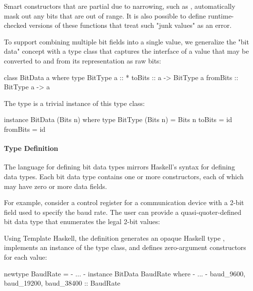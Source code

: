 Smart constructors that are partial due to narrowing,
such as , automatically mask out any bits that are
out of range. It is also possible to define runtime-checked versions
of these functions that treat such "junk values" as an error.

To support combining multiple bit fields into a single value, we
generalize the "bit data" concept with a type class 
that captures the interface of a value that may be converted to
and from its representation as raw bits:

\begin{code}
class BitData a where
  type BitType a :: *
  toBits :: a -> BitType a
  fromBits :: BitType a -> a
\end{code}

The  type is a trivial instance of this type class:

\begin{code}
instance BitData (Bits n) where
  type BitType (Bits n) = Bits n
  toBits   = id
  fromBits = id
\end{code}

\paragraph{Type Definition}
The language for defining bit data types mirrors Haskell's syntax
for defining data types. Each bit data type contains one or more
constructors, each of which may have zero or more data fields.

For example, consider a control register for a communication device
with a 2-bit field used to specify the baud rate. The user can provide a quasi-quoter-defined
bit data type  that enumerates the legal 2-bit values:

\begin{code}
[ivory|
  bitdata BaudRate :: Bits 2
    = baud_9600   as 0b00
    | baud_19200  as 0b01
    | baud_38400  as 0b10
    -- bit pattern 0b11 is invalid
|]
\end{code}

Using Template Haskell, the definition generates an opaque Haskell type ,
implements an instance of the  type class, and defines
zero-argument constructors for each value:

\begin{code}
newtype BaudRate = {- ... -}
instance BitData BaudRate where {- ... -}
baud_9600, baud_19200, baud_38400 :: BaudRate
\end{code}

